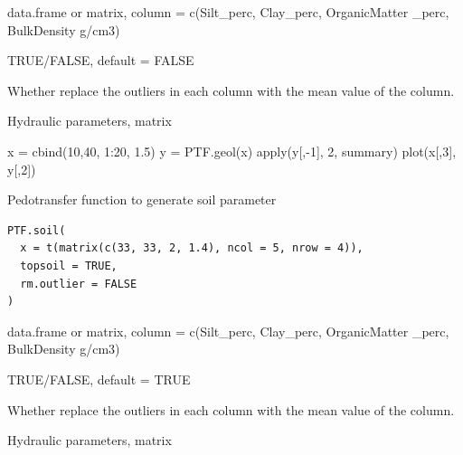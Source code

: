\documentclass[a4paper]{book}
\begin{document}
%
\begin{Arguments}
\begin{ldescription}
\item[\code{x}] data.frame or matrix, column = c(Silt\_perc, Clay\_perc, OrganicMatter \_perc, BulkDensity g/cm3)

\item[\code{topsoil}] TRUE/FALSE, default = FALSE

\item[\code{rm.outlier}] Whether replace the outliers in each column with the mean value of the column.
\end{ldescription}
\end{Arguments}
%
\begin{Value}
Hydraulic parameters, matrix
\end{Value}
%
\begin{Examples}
\begin{ExampleCode}
x = cbind(10,40, 1:20, 1.5)
y = PTF.geol(x)
apply(y[,-1], 2, summary)
plot(x[,3], y[,2])
\end{ExampleCode}
\end{Examples}
%
\begin{Description}\relax
Pedotransfer function to generate soil parameter
\end{Description}
%
\begin{Usage}
\begin{verbatim}
PTF.soil(
  x = t(matrix(c(33, 33, 2, 1.4), ncol = 5, nrow = 4)),
  topsoil = TRUE,
  rm.outlier = FALSE
)
\end{verbatim}
\end{Usage}
%
\begin{Arguments}
\begin{ldescription}
\item[\code{x}] data.frame or matrix, column = c(Silt\_perc, Clay\_perc, OrganicMatter \_perc, BulkDensity g/cm3)

\item[\code{topsoil}] TRUE/FALSE, default = TRUE

\item[\code{rm.outlier}] Whether replace the outliers in each column with the mean value of the column.
\end{ldescription}
\end{Arguments}
%
\begin{Value}
Hydraulic parameters, matrix
\end{Value}
\end{document}

